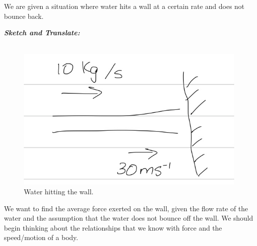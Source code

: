 %
%


\begin{subquestions}
	
	\subquestion
	We are given a situation where water hits a wall at a certain rate and does not bounce back.
	
	\textbf{\textit{Sketch and Translate:}} \\ \\
	\begin{figure}[H]
		\begin{center}
			\includegraphics[scale=0.25]{../2015/figures/2015q6-1}
			\caption{\label{2015:q66:fig:Sketch1} Water hitting the wall.}
		\end{center}
	\end{figure}
	We want to find the average force exerted on the wall, given the flow rate of the water and the assumption that the water does not bounce off the wall. We should begin thinking about the relationships that we know with force and the speed/motion of a body.
	
	
	

\end{subquestions}
